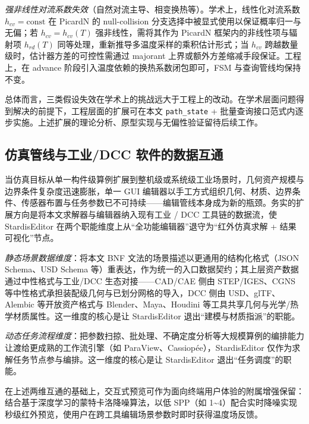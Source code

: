 \emph{强非线性对流系数失效}（自然对流主导、相变换热等）。学术上，线性化对流系数 $h_{cv}=\mathrm{const}$ 在 PicardN 的 null-collision 分支选择中被显式使用以保证概率归一与无偏；若 $h_{cv}=h_{cv}(T)$ 强非线性，需将其作为 PicardN 框架内的非线性项与辐射项 $h_{rd}(T)$ 同等处理，重新推导多温度采样的乘积估计形式；当 $h_{cv}$ 跨越数量级时，估计器方差的可控性需通过 majorant 上界或额外方差缩减手段保证。工程上，在 advance 阶段引入温度依赖的换热系数闭包即可，FSM 与查询管线均保持不变。

总体而言，三类假设失效在学术上的挑战远大于工程上的改动。在学术层面问题得到解决的前提下，工程层面的扩展可在本文 \texttt{path\_state} + 批量查询接口范式内逐步实施。上述扩展的理论分析、原型实现与无偏性验证留待后续工作。

\subsection{ 仿真管线与工业/DCC 软件的数据互通 }当仿真目标从单一构件级算例扩展到整机级或系统级工业场景时，几何资产规模与边界条件复杂度迅速膨胀，单一 GUI 编辑器以手工方式组织几何、材质、边界条件、传感器布置与任务参数已不可持续——编辑管线本身成为新的瓶颈。务实的扩展方向是将本文求解器与编辑器纳入现有工业 / DCC 工具链的数据流，使 StardisEditor 在两个职能维度上从“全功能编辑器”退守为“红外仿真求解 + 结果可视化”节点。

\emph{静态场景数据维度}：将本文 BNF 文法的场景描述以更通用的结构化格式（JSON Schema、USD Schema 等）重表达，作为统一的入口数据契约；其上层资产数据通过中性格式与工业/DCC 生态对接——CAD/CAE 侧由 STEP/IGES、CGNS 等中性格式承担装配级几何与已划分网格的导入，DCC 侧由 USD、glTF、Alembic 等开放资产格式与 Blender、Maya、Houdini 等工具共享几何与光学/热学材质属性。这一维度的核心是让 StardisEditor 退出“建模与材质指派”的职能。

\emph{动态任务流程维度}：把参数扫掠、批处理、不确定度分析等大规模算例的编排能力让渡给更成熟的工作流引擎（如 ParaView、Cassiopée），StardisEditor 仅作为求解任务节点参与编排。这一维度的核心是让 StardisEditor 退出“任务调度”的职能。

在上述两维互通的基础上，交互式预览可作为面向终端用户体验的附属增强保留：结合基于深度学习的蒙特卡洛降噪算法，以低 SPP（如 1\textasciitilde 4）配合实时降噪实现秒级红外预览，使用户在跨工具编辑场景参数时即时获得温度场反馈。